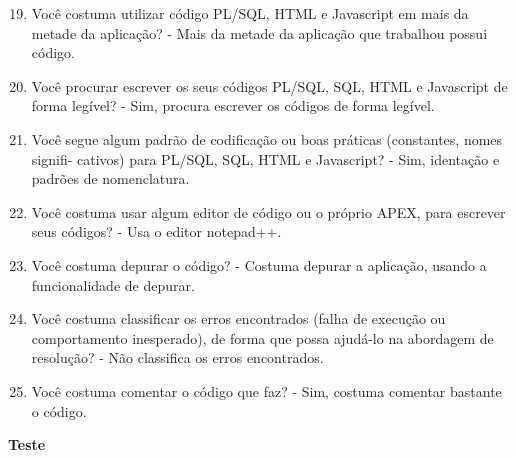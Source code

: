 \begin{apendicesenv}
\begin{enumerate}
	\setcounter{enumi}{18}
	\item Você costuma utilizar código PL/SQL, HTML e Javascript em mais da metade da
	aplicação?\newline
	- Mais da metade da aplicação que trabalhou possui código.
	\item Você procurar escrever os seus códigos PL/SQL, SQL, HTML e Javascript de forma
	legível?\newline
	- Sim, procura escrever os códigos de forma legível.
	\item Você segue algum padrão de codificação ou boas práticas (constantes, nomes signifi-
	cativos) para PL/SQL, SQL, HTML e Javascript?\newline
	- Sim, identação e padrões de nomenclatura.
	\item Você costuma usar algum editor de código ou o próprio APEX, para escrever seus
	códigos?\newline
	- Usa o editor notepad++.
	\item Você costuma depurar o código?\newline
	- Costuma depurar a aplicação, usando a funcionalidade de depurar.
	\item Você costuma classificar os erros encontrados (falha de execução ou comportamento
	inesperado), de forma que possa ajudá-lo na abordagem de resolução?\newline
	- Não classifica os erros encontrados.
	\item Você costuma comentar o código que faz?\newline
	- Sim, costuma comentar bastante o código.
\end{enumerate}

\textbf{Teste}


\end{apendicesenv}
